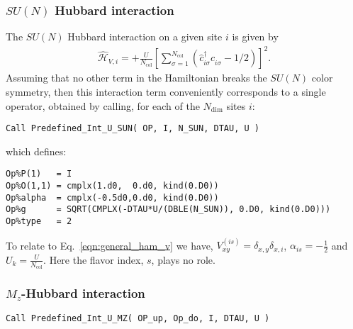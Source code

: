 \subsubsection{$SU(N)$ Hubbard interaction}
\label{Hubbard_SUN_HS.eq}
The $SU(N)$ Hubbard interaction on a given site $i$ is given by 
\begin{align}
\hat{\mathcal{H}}_{V,i} =
+ \frac{U}{N_{\mathrm{col}}}\left[
\sum\limits_{\sigma=1}^{N_{\mathrm{col}}}
\left(  \hat{c}^{\dagger}_{i \sigma} \hat{c}^{\phantom\dagger}_{i\sigma}  -1/2 \right) \right]^{2}.
\end{align} 
Assuming that no other term in the Hamiltonian breaks the $SU(N) $ color symmetry, then this interaction term conveniently corresponds to  a single operator, obtained by calling, for each of the $N_{\mathrm{dim}}$ sites $i$:
\begin{lstlisting}[style=fortran]
Call Predefined_Int_U_SUN( OP, I, N_SUN, DTAU, U )
\end{lstlisting}
which defines:

\begin{lstlisting}[style=fortran]
Op%P(1)   = I
Op%O(1,1) = cmplx(1.d0,  0.d0, kind(0.D0))
Op%alpha  = cmplx(-0.5d0,0.d0, kind(0.D0))
Op%g      = SQRT(CMPLX(-DTAU*U/(DBLE(N_SUN)), 0.D0, kind(0.D0))) 
Op%type   = 2

\end{lstlisting}

To relate to  Eq.~\eqref{eqn:general_ham_v} we have,   $V_{x y}^{(is)} =  \delta_{x,y} \delta_{x,i}$, $\alpha_{is} = -\frac{1}{2}$ and $U_{k} =  \frac{U}{N_{\mathrm{col}}}$.   Here  the flavor index, $s$,  plays no role. 


\subsubsection{$M_z$-Hubbard interaction}

\begin{lstlisting}[style=fortran]
Call Predefined_Int_U_MZ( OP_up, Op_do, I, DTAU, U )
\end{lstlisting}

